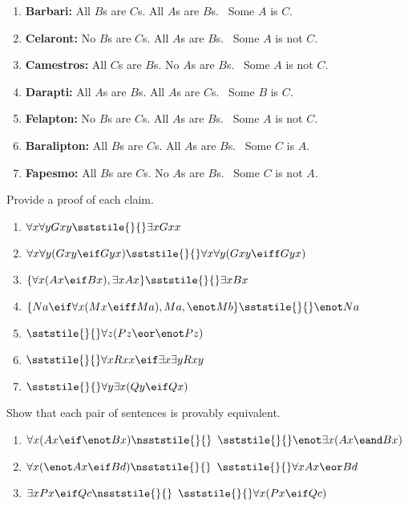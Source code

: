 \begin{enumerate}[label=\arabic*), topsep=0pt, parsep=0pt, itemsep=3pt]

\item\textbf{Barbari:} All $B$s are $C$s. All $A$s are $B$s.
	\therefore\  Some $A$ is $C$.
\item\textbf{Celaront:} No $B$s are $C$s. All $A$s are $B$s.
	\therefore\  Some $A$ is not $C$.
\item\textbf{Camestros:} All $C$s are $B$s. No $A$s are $B$s.
	\therefore\  Some $A$ is not $C$.
\item\textbf{Darapti:} All $A$s are $B$s. All $A$s are $C$s.
	\therefore\  Some $B$ is $C$.
\item\textbf{Felapton:} No $B$s are $C$s. All $A$s are $B$s.
	\therefore\  Some $A$ is not $C$.
\item\textbf{Baralipton:} All $B$s are $C$s. All $A$s are $B$s.
	\therefore\  Some $C$ is $A$.
\item\textbf{Fapesmo:} All $B$s are $C$s. No $A$s are $B$s.
	\therefore\  Some $C$ is not $A$.
\end{enumerate}



\problempart
Provide a proof of each claim.
\begin{enumerate}[label=\arabic*), topsep=0pt, parsep=0pt, itemsep=3pt]
\item $\forall x \forall y Gxy \sststile{}{} \exists x Gxx$
\item $\forall x \forall y (Gxy \eif Gyx) \sststile{}{} \forall x\forall y (Gxy \eiff Gyx)$
\item $\{\forall x(Ax\eif Bx), \exists x Ax\} \sststile{}{} \exists x Bx$
\item $\{Na \eif \forall x(Mx \eiff Ma), Ma, \enot Mb\}\sststile{}{} \enot Na$
\item $\sststile{}{}\forall z (Pz \eor \enot Pz)$
\item $\sststile{}{}\forall x Rxx\eif \exists x \exists y Rxy$
\item $\sststile{}{}\forall y \exists x (Qy \eif Qx)$
\end{enumerate}

\problempart
Show that each pair of sentences is provably equivalent.
\begin{enumerate}[label=\arabic*), topsep=0pt, parsep=0pt, itemsep=3pt]
\item $\forall x (Ax\eif \enot Bx) \nsststile{}{} \hspace{.5em} \sststile{}{}\enot\exists x(Ax \eand Bx)$
\item $\forall x (\enot Ax\eif Bd) \nsststile{}{} \hspace{.5em} \sststile{}{} \forall x Ax \eor Bd$
\item $\exists x Px \eif Qc \nsststile{}{} \hspace{.5em} \sststile{}{}\forall x (Px \eif Qc)$
\end{enumerate}



